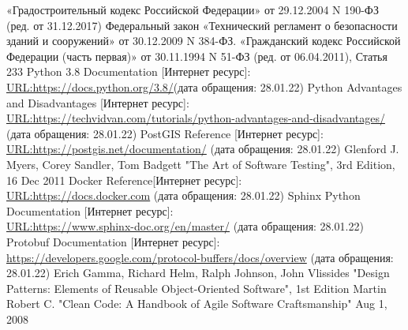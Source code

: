 \begin{thebibliography}{8}
	«Градостроительный кодекс Российской Федерации» от 29.12.2004 N 190-ФЗ (ред. от 31.12.2017)
	Федеральный закон «Технический регламент о безопасности зданий и сооружений» от 30.12.2009 N 384-ФЗ.
	«Гражданский кодекс Российской Федерации (часть первая)» от 30.11.1994 N 51-ФЗ (ред. от 06.04.2011), Статья 233
	 Python 3.8 Documentation [Интернет ресурс]:\\
	\url{URL:https://docs.python.org/3.8/}(дата обращения: 28.01.22)
	 Python Advantages and Disadvantages [Интернет ресурс]:\\
	\url{URL:https://techvidvan.com/tutorials/python-advantages-and-disadvantages/} (дата обращения: 28.01.22)
	 PostGIS Reference [Интернет ресурс]:\\
	\url{URL:https://postgis.net/documentation/} (дата обращения: 28.01.22)
	Glenford J. Myers, Corey Sandler, Tom Badgett "The Art of Software Testing", 3rd Edition, 16 Dec 2011
	 Docker Reference[Интернет ресурс]:\\
	\url{URL:https://docs.docker.com} (дата обращения: 28.01.22)
	 Sphinx Python Documentation [Интернет ресурс]:\\
	\url{URL:https://www.sphinx-doc.org/en/master/} (дата обращения: 28.01.22)
	 Protobuf Documentation [Интернет ресурс]:\\
	\url{https://developers.google.com/protocol-buffers/docs/overview} (дата обращения: 28.01.22)
	Erich Gamma, Richard Helm, Ralph Johnson, John Vlissides
	"Design Patterns: Elements of Reusable Object-Oriented Software", 1st Edition
	Martin Robert C. "Clean Code: A Handbook of Agile Software Craftsmanship" Aug 1, 2008
\end{thebibliography}
